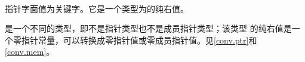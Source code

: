 
\paragraph{} %
指针字面值为关键字。它是一个类型为的纯右值。

\begin{note}
  是一个不同的类型，即不是指针类型也不是成员指针类型；该类型
  的纯右值是一个零指针常量，可以转换成零指针值或零成员指针值。见\ref{conv.ptr}和
  \ref{conv.mem}。
\end{note}
